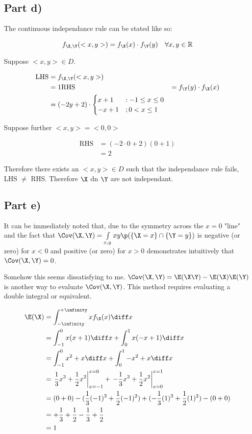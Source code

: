 \subsection{Part d)}

The continuous independance rule can be stated like so:

\begin{equation*}
f_{\X, \Y}(<x, y>) = f_\X(x) \cdot f_\Y(y) \quad \forall x,y\in \mathbb{R}
\end{equation*}

Suppose $<x, y> \in D$.

\begin{align*}
\text{LHS} &= f_{\X, \Y}(<x, y>) \\
&= 1
\text{RHS} &= f_\Y(y) \cdot f_\X(x) \\
&= (-2y + 2) \cdot \begin{cases}
x + 1 &: -1 \leq x \leq 0 \\
-x + 1 &; 0 < x \leq 1 \\
\end{cases}
\end{align*}

Suppose further $<x, y> = <0, 0>$

\begin{align*}
\text{RHS} &= (-2 \cdot 0 + 2)(0 + 1) \\
&= 2
\end{align*}

Therefore there exists an $<x, y> \in D$ such that the independance rule fails, LHS $\neq$ RHS.
Therefore $\X$ dn $\Y$ are not independant.

\subsection{Part e)}

It can be immediately noted that, due to the symmetry across the $x=0$ "line" and the fact that $\Cov(\X, \Y) = \int \limits _{x,y} xy\p(\{ \X = x\} \cap \{ \Y = y \})$
is negative (or zero) for $x < 0$ and positive (or zero) for $x > 0$ demonstrates intuitively that $\Cov(\X, \Y) = 0$.

Somehow this seems dissatisfying to me.
$\Cov(\X, \Y) = \E(\X\Y) - \E(\X)\E(\Y)$ is another way to evaluate $\Cov(\X, \Y)$.
This method requires evaluating a double integral or equivalent.

\begin{align*}
\E(\X) &= \int _{-\infinity} ^{+\infinity} x f_\X(x) \diff x \\
&= \int _{-1} ^0 x(x+1)\diff x + \int _0 ^1 x(-x + 1) \diff x \\
&= \int _{-1} ^0 x^2+x \diff x + \int _0 ^{1} -x^2 + x \diff x \\
&= \left. \frac{1}{3}x^3 + \frac{1}{2}x^2 \right|^{x=0}_{x=-1} +
\left. -\frac{1}{3}x^3 + \frac{1}{2}x^2 \right|^{x=1}_{x=0} \\
&= (0 + 0) - (\frac{1}{3}(-1)^3 + \frac{1}{2}(-1)^2) +
(-\frac{1}{3}(1)^3 + \frac{1}{2}(1)^2) - (0 + 0) \\
&= +\frac{1}{3} + \frac{1}{2} - \frac{1}{3} + \frac{1}{2} \\
&= 1
\end{align*}

